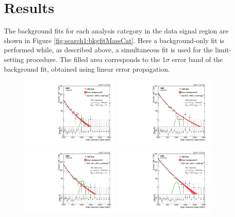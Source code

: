 \clearpage

\section{Results}
\label{sec:searchI:results}
The background fits for each analysis category in the data signal region are shown in Figure \ref{fig:search1:bkgfitMassCat}. Here a background-only fit is performed while, as described above, a simultaneous fit is used for the limit-setting procedure. The filled area corresponds to the $1 \sigma$ error band of the background fit, obtained using linear error propagation.
\begin{figure}[h!]
\centering
\includegraphics[width=0.45\textwidth]{figures/analysis/search1/AN-15-211/fits/MLfits/BkgFit_DijetMassHighPuriWW.pdf}
\includegraphics[width=0.45\textwidth]{figures/analysis/search1/AN-15-211/fits/MLfits/BkgFit_DijetMassLowPuriWW.pdf}\\
\includegraphics[width=0.45\textwidth]{figures/analysis/search1/AN-15-211/fits/MLfits/BkgFit_DijetMassHighPuriWZ.pdf}
\includegraphics[width=0.45\textwidth]{figures/analysis/search1/AN-15-211/fits/MLfits/BkgFit_DijetMassLowPuriWZ.pdf}\\

\end{figure}
